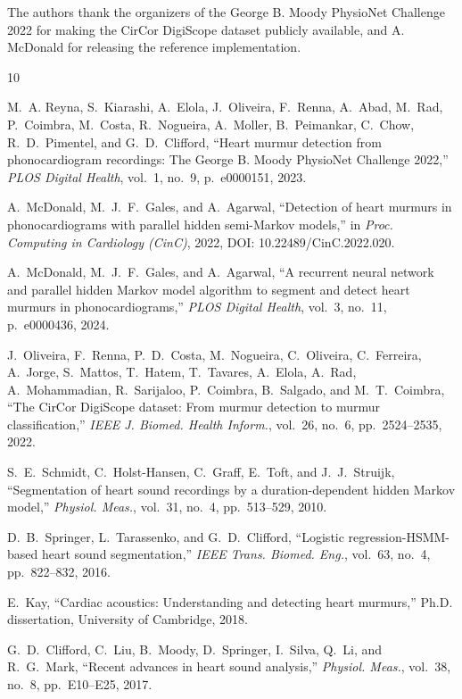 \documentclass[conference]{IEEEtran}
\begin{document}
The authors thank the organizers of the George B. Moody PhysioNet
Challenge 2022 for making the CirCor DigiScope dataset publicly
available, and A. McDonald for releasing the reference implementation.

\balance
\begin{thebibliography}{10}

M.~A. Reyna, S.~Kiarashi, A.~Elola, J.~Oliveira, F.~Renna,
A.~Abad, M.~Rad, P.~Coimbra, M.~Costa, R.~Nogueira, A.~Moller,
B.~Peimankar, C.~Chow, R.~D.~Pimentel, and G.~D.~Clifford,
``Heart murmur detection from phonocardiogram recordings: The
George B. Moody PhysioNet Challenge 2022,''
\textit{PLOS Digital Health}, vol.~1, no.~9, p.~e0000151, 2023.

A.~McDonald, M.~J.~F.~Gales, and A.~Agarwal,
``Detection of heart murmurs in phonocardiograms with parallel
hidden semi-Markov models,''
in \textit{Proc. Computing in Cardiology (CinC)}, 2022,
DOI: 10.22489/CinC.2022.020.

A.~McDonald, M.~J.~F.~Gales, and A.~Agarwal,
``A recurrent neural network and parallel hidden Markov model
algorithm to segment and detect heart murmurs in phonocardiograms,''
\textit{PLOS Digital Health}, vol.~3, no.~11, p.~e0000436, 2024.

J.~Oliveira, F.~Renna, P.~D.~Costa, M.~Nogueira, C.~Oliveira,
C.~Ferreira, A.~Jorge, S.~Mattos, T.~Hatem, T.~Tavares,
A.~Elola, A.~Rad, A.~Mohammadian, R.~Sarijaloo, P.~Coimbra,
B.~Salgado, and M.~T.~Coimbra,
``The CirCor DigiScope dataset: From murmur detection to murmur
classification,''
\textit{IEEE J. Biomed. Health Inform.}, vol.~26, no.~6,
pp.~2524--2535, 2022.

S.~E.~Schmidt, C.~Holst-Hansen, C.~Graff, E.~Toft, and
J.~J.~Struijk,
``Segmentation of heart sound recordings by a duration-dependent
hidden Markov model,''
\textit{Physiol. Meas.}, vol.~31, no.~4, pp.~513--529, 2010.

D.~B.~Springer, L.~Tarassenko, and G.~D.~Clifford,
``Logistic regression-HSMM-based heart sound segmentation,''
\textit{IEEE Trans. Biomed. Eng.}, vol.~63, no.~4, pp.~822--832,
2016.

E.~Kay,
``Cardiac acoustics: Understanding and detecting heart murmurs,''
Ph.D. dissertation, University of Cambridge, 2018.

G.~D.~Clifford, C.~Liu, B.~Moody, D.~Springer, I.~Silva,
Q.~Li, and R.~G.~Mark,
``Recent advances in heart sound analysis,''
\textit{Physiol. Meas.}, vol.~38, no.~8, pp.~E10--E25, 2017.

\end{thebibliography}
\end{document}
